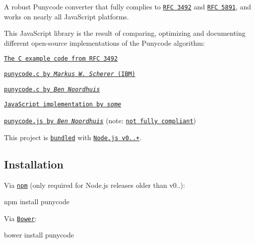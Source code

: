 A robust Punycode converter that fully complies to \href{http://tools.ietf.org/html/rfc3492}{\tt R\+FC 3492} and \href{http://tools.ietf.org/html/rfc5891}{\tt R\+FC 5891}, and works on nearly all Java\+Script platforms.

This Java\+Script library is the result of comparing, optimizing and documenting different open-\/source implementations of the Punycode algorithm\+:


\begin{DoxyItemize}
\item \href{http://tools.ietf.org/html/rfc3492#appendix-C}{\tt The C example code from R\+FC 3492}
\item \href{http://opensource.apple.com/source/ICU/ICU-400.42/icuSources/common/punycode.c}{\tt {\ttfamily punycode.\+c} by {\itshape Markus W. Scherer} (I\+BM)}
\item \href{https://github.com/bnoordhuis/punycode/blob/master/punycode.c}{\tt {\ttfamily punycode.\+c} by {\itshape Ben Noordhuis}}
\item \href{http://stackoverflow.com/questions/183485/can-anyone-recommend-a-good-free-javascript-for-punycode-to-unicode-conversion/301287#301287}{\tt Java\+Script implementation by {\itshape some}}
\item \href{https://github.com/joyent/node/blob/426298c8c1c0d5b5224ac3658c41e7c2a3fe9377/lib/punycode.js}{\tt {\ttfamily punycode.\+js} by {\itshape Ben Noordhuis}} (note\+: \href{https://github.com/joyent/node/issues/2072}{\tt not fully compliant})
\end{DoxyItemize}

This project is \href{https://github.com/joyent/node/blob/master/lib/punycode.js}{\tt bundled} with \href{https://github.com/joyent/node/compare/975f1930b1...61e796decc}{\tt Node.\+js v0..+}.

\subsection*{Installation}

Via \href{http://npmjs.org/}{\tt npm} (only required for Node.\+js releases older than v0..)\+:


\begin{DoxyCode}
npm install punycode
\end{DoxyCode}


Via \href{http://bower.io/}{\tt Bower}\+:


\begin{DoxyCode}
bower install punycode
\end{DoxyCode}


